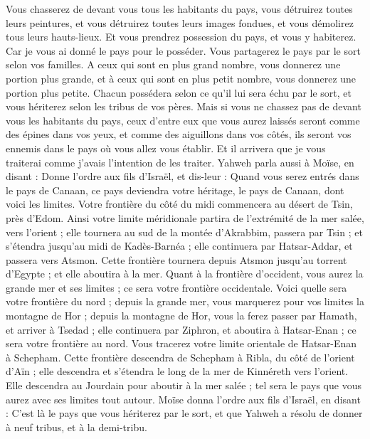 \begin{multicols}{2}
Vous chasserez de devant vous tous les habitants du pays, vous détruirez toutes leurs peintures, et vous détruirez toutes leurs images fondues, et vous démolirez tous leurs hauts-lieux.
Et vous prendrez possession du pays, et vous y habiterez. Car je vous ai donné le pays pour le posséder.
Vous partagerez le pays par le sort selon vos familles. A ceux qui sont en plus grand nombre, vous donnerez une portion plus grande, et à ceux qui sont en plus petit nombre, vous donnerez une portion plus petite. Chacun possédera selon ce qu'il lui sera échu par le sort, et vous hériterez selon les tribus de vos pères.
Mais si vous ne chassez pas de devant vous les habitants du pays, ceux d'entre eux que vous aurez laissés seront comme des épines dans vos yeux, et comme des aiguillons dans vos côtés, ils seront vos ennemis dans le pays où vous allez vous établir.
Et il arrivera que je vous traiterai comme j'avais l’intention de les traiter.
\VerseOne{}Yahweh parla aussi à Moïse, en disant :
Donne l’ordre aux fils d'Israël, et dis-leur : Quand vous serez entrés dans le pays de Canaan, ce pays deviendra votre héritage, le pays de Canaan, dont voici les limites.
Votre frontière du côté du midi commencera au désert de Tsin, près d'Edom. Ainsi votre limite méridionale partira de l’extrémité de la mer salée, vers l'orient ;
elle tournera au sud de la montée d’Akrabbim, passera par Tsin ; et s’étendra jusqu’au midi de Kadès-Barnéa ; elle continuera par Hatsar-Addar, et passera vers Atsmon.
Cette frontière tournera depuis Atsmon jusqu'au torrent d'Egypte ; et elle aboutira à la mer.
Quant à la frontière d'occident, vous aurez la grande mer et ses limites ; ce sera votre frontière occidentale.
Voici quelle sera votre frontière du nord ; depuis la grande mer, vous marquerez pour vos limites la montagne de Hor ;
depuis la montagne de Hor, vous la ferez passer par Hamath, et arriver à Tsedad ;
elle continuera par Ziphron, et aboutira à Hatsar-Enan ; ce sera votre frontière au nord.
Vous tracerez votre limite orientale de Hatsar-Enan à Schepham.
Cette frontière descendra de Schepham à Ribla, du côté de l'orient d’Aïn ; elle descendra et s'étendra le long de la mer de Kinnéreth vers l'orient.
Elle descendra au Jourdain pour aboutir à la mer salée ; tel sera le pays que vous aurez avec ses limites tout autour.
Moïse donna l’ordre aux fils d'Israël, en disant : C'est là le pays que vous hériterez par le sort, et que Yahweh a résolu de donner à neuf tribus, et à la demi-tribu.

\end{multicols}
